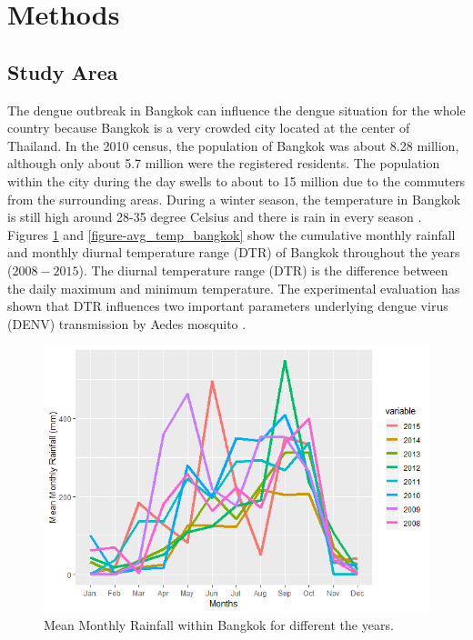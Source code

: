 \documentclass{bmcart}
\begin{document}
%




\section{Methods}



\subsection{Study Area}


The dengue outbreak in Bangkok can influence the dengue situation for the whole country because Bangkok is a very crowded city located at the center of Thailand. In the 2010 census, the population of Bangkok was about 8.28 million, although only about 5.7 million were the registered residents. The population within the city during the day swells to about to 15 million \cite{WPR2015} due to the commuters from the surrounding areas. During a winter season, the temperature in Bangkok is still high around 28-35 degree Celsius and there is rain in every season \cite{wwo2012}. Figures \ref{figure-avg_rain_bangkok} and \ref{figure-avg_temp_bangkok} show the cumulative monthly rainfall and monthly diurnal temperature range (DTR) of Bangkok throughout the years ($2008-2015$).  The diurnal temperature range (DTR) is the difference between the daily maximum and minimum temperature. The experimental evaluation has shown that DTR influences two important parameters underlying dengue virus (DENV) transmission by Aedes mosquito \cite{lambrechts2011impact}. 


\begin{figure}[htbp]
	\begin{center}
		\includegraphics[width= 1.0\textwidth]{1-AvgMonthlyRainfall}
		\caption{Mean Monthly Rainfall within Bangkok for different the years.}
		\label{figure-avg_rain_bangkok}
	\end{center}
\end{figure}
\end{document}
